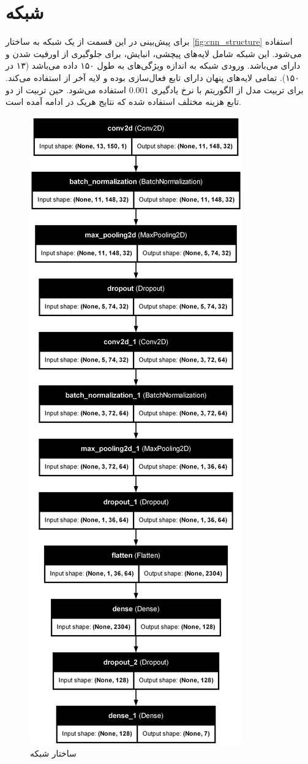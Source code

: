 \documentclass[11pt]{article}
\begin{document}
	\section{شبکه }
	برای پیش‌بینی در این قسمت از یک شبکه  به ساختار 
	\autoref{fig:cnn_structure}
	استفاده می‌شود. این شبکه شامل لایه‌های پیچشی، انبایش،  برای جلوگیری از اورفیت شدن و دارای  می‌باشد. ورودی شبکه به اندازه ویژگی‌های  به طول ۱۵۰ داده می‌باشد (۱۳ در ۱۵۰). تمامی لایه‌های پنهان دارای تابع فعال‌سازی  بوده و لایه آخر از استفاده می‌کند. برای تربیت مدل از الگوریتم  با نرخ یادگیری $0.001$ استفاده می‌شود. حین تربیت از دو تابع هزینه مختلف استفاده شده که نتایج هریک در ادامه آمده است.\\
	\begin{figure}[htbp]
		\centerline{\includegraphics[width=0.3\linewidth]{../cnn_structure.png}}
		\caption{ساختار شبکه }
		\label{fig:CNN_structure}
	\end{figure}\\
\end{document}

